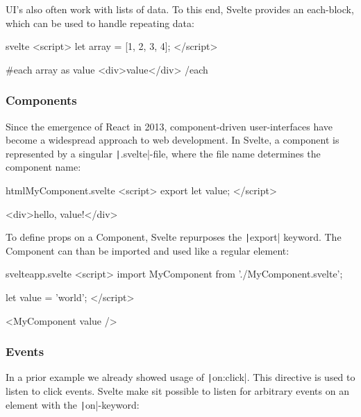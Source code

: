 UI's also often work with lists of data. To this end, Svelte provides an each-block, which can be used to handle repeating data:

\begin{myminted}[highlightlines={5-7}]{svelte}{}
<script>
    let array = [1, 2, 3, 4];
</script>

{#each array as value}
    <div>{value}</div>
{/each}
\end{myminted}

\subsubsection{Components}


Since the emergence of React in 2013, component-driven user-interfaces have become a widespread approach to web development. In Svelte, a component is represented by a singular \texttt|.svelte|-file, where the file name determines the component name: 

\begin{myminted}{html}{MyComponent.svelte}
<script>
    export let value;
</script>

<div>hello, {value}!</div>
\end{myminted}

To define props on a Component, Svelte repurposes the \texttt|export| keyword. The Component can than be imported and used like a regular element:

\begin{myminted}{svelte}{app.svelte}
<script>
    import MyComponent from './MyComponent.svelte';

    let value = 'world';
</script>

<MyComponent {value} />
\end{myminted}

\subsubsection{Events}


In a prior example we already showed usage of \texttt|on:click|. This directive is used to listen to click events. Svelte make sit possible to listen for arbitrary events on an element with the \texttt|on|-keyword:

